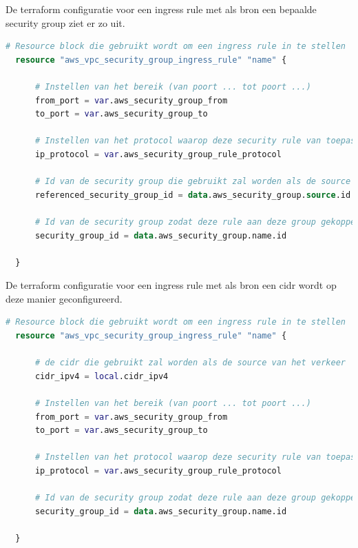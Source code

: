 De terraform configuratie voor een ingress rule met als bron een bepaalde security group ziet er zo uit.
\newline

\begin{lstlisting}[language=terraform]
  # Resource block die gebruikt wordt om een ingress rule in te stellen
  resource "aws_vpc_security_group_ingress_rule" "name" {
  
      # Instellen van het bereik (van poort ... tot poort ...)
      from_port = var.aws_security_group_from
      to_port = var.aws_security_group_to
  
      # Instellen van het protocol waarop deze security rule van toepassing is tcp/udp of -1 voor beide
      ip_protocol = var.aws_security_group_rule_protocol
  
      # Id van de security group die gebruikt zal worden als de source van het verkeer
      referenced_security_group_id = data.aws_security_group.source.id
  
      # Id van de security group zodat deze rule aan deze group gekoppeld kan worden
      security_group_id = data.aws_security_group.name.id
    
  }
\end{lstlisting}

\vspace{0.5cm}
De terraform configuratie voor een ingress rule met als bron een cidr wordt op deze manier geconfigureerd.
\newline

\begin{lstlisting}[language=terraform]
  # Resource block die gebruikt wordt om een ingress rule in te stellen
  resource "aws_vpc_security_group_ingress_rule" "name" {
  
      # de cidr die gebruikt zal worden als de source van het verkeer
      cidr_ipv4 = local.cidr_ipv4
  
      # Instellen van het bereik (van poort ... tot poort ...)
      from_port = var.aws_security_group_from
      to_port = var.aws_security_group_to
  
      # Instellen van het protocol waarop deze security rule van toepassing is tcp/udp of -1 voor beide
      ip_protocol = var.aws_security_group_rule_protocol
  
      # Id van de security group zodat deze rule aan deze group gekoppeld kan worden
      security_group_id = data.aws_security_group.name.id
    
  }
\end{lstlisting}

